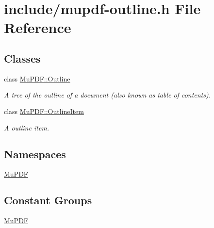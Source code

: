 \hypertarget{mupdf-outline_8h}{\section{include/mupdf-\/outline.h File Reference}
\label{mupdf-outline_8h}
}
\subsection*{Classes}
\begin{DoxyCompactItemize}
\item 
class \hyperlink{class_mu_p_d_f_1_1_outline}{Mu\-P\-D\-F\-::\-Outline}
\begin{DoxyCompactList}\small\item\em A tree of the outline of a document (also known as table of contents). \end{DoxyCompactList}\item 
class \hyperlink{class_mu_p_d_f_1_1_outline_item}{Mu\-P\-D\-F\-::\-Outline\-Item}
\begin{DoxyCompactList}\small\item\em A outline item. \end{DoxyCompactList}\end{DoxyCompactItemize}
\subsection*{Namespaces}
\begin{DoxyCompactItemize}
\item 
\hyperlink{namespace_mu_p_d_f}{Mu\-P\-D\-F}
\end{DoxyCompactItemize}
\subsection*{Constant Groups}
\begin{DoxyCompactItemize}
\item 
\hyperlink{namespace_mu_p_d_f}{Mu\-P\-D\-F}
\end{DoxyCompactItemize}
